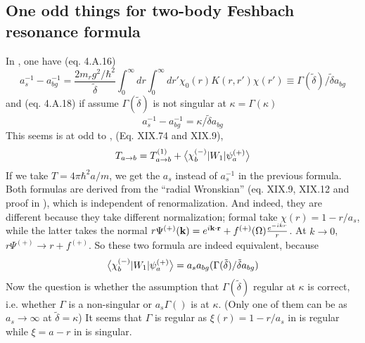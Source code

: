 \subsection{One odd things for two-body Feshbach resonance formula}
In \cite{Leggett},  one have (eq. 4.A.16)
\begin{equation}\label{eq:20100920:leggett}
a^{-1}_{s}-a^{-1}_{bg}=\frac{2m_{r}g^{2}/\hbar^{2}}{\tilde\delta}\int^{\infty}_{0}dr\int_{0}^{\infty}{dr'}\chi_{0}(r)K(r,r')\chi(r')\equiv{}\Gamma(\tilde\delta)/\tilde{\delta}a_{bg}
\end{equation}
and (eq. 4.A.18) if assume $\Gamma(\tilde\delta)$ is not singular at $\kappa=\Gamma(\kappa)$
\begin{equation}\label{eq:20100920:messiah}
a^{-1}_{s}-a^{-1}_{bg}=\kappa/\tilde{\delta}a_{bg}
\end{equation}
 This seems is at odd to \cite{Messiah}, (Eq. XIX.74 and XIX.9),
\begin{equation}
T_{a\rightarrow{b}}=T^{(1)}_{a\rightarrow{b}}+\bigl<{\chi_{b}^{(-)}{\lvert{W_{1}}\rvert}\psi_{a}^{(+)}}\bigr>
\end{equation}
If we take $T=4\pi\hbar^{2}a/m$, we get the $a_{s}$ instead of $a_{s}^{-1}$ in the previous formula.  
Both formulas are derived from the ``radial Wronskian'' (eq. XIX.9, XIX.12 and proof in \cite{Messiah}), which is independent of renormalization.  And indeed, they are different because they take different normalization;  formal take $\chi(r)=1-r/a_{s}$, while the latter takes the normal $r\Psi^{(+)}(\mathbf{k})=e^{i\mathbf{k}\cdot\mathbf{r}}+f^{(+)}(\Omega)\frac{e^{-ikr}}{r}$.  At $k\longrightarrow0$, $r\Psi^{(+)}\longrightarrow{r+f^{(+)}}$.  So these two formula are indeed equivalent, because 
\[
\bigl<{\chi_{b}^{(-)}{\lvert{W_{1}}\rvert}\psi_{a}^{(+)}}\bigr>=a_{s}a_{bg}(\Gamma(\tilde\delta)/\tilde{\delta}a_{bg})
\]
Now the question is whether the assumption that $\Gamma(\tilde\delta)$ regular at $\kappa$ is correct, i.e. whether $\Gamma$ is a non-singular or $a_{s}\Gamma()$ is at $\kappa$. (Only one of them can be as $a_{s}\rightarrow\infty$ at $\tilde\delta=\kappa$)  It seems that $\Gamma$ is regular as $\xi(r)=1-r/a_{s}$ in  is regular while $\xi=a-r$ in  is singular.  